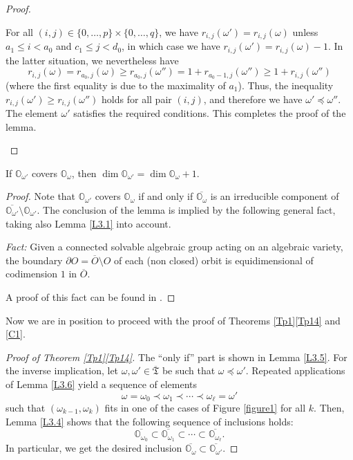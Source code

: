 \documentclass[ALCO,Unicode]{cedram}
\newcommand{\Xorbit}{\mathbb{O}}
\newcommand{\ppermutationsof}{\mathfrak{T}}
\newcommand{\parameters}{\overline{\ppermutationsof}}
\begin{document}
\begin{proof}
\begin{enumerate}[label=\textbf{Case \arabic*}]
For all $(i,j)\in\{0,\ldots,p\}\times\{0,\ldots,q\}$, we have $r_{i,j}(\omega')=r_{i,j}(\omega)$ unless $a_1\leq i<a_0$ and $c_1\leq j<d_0$, in which case we have $r_{i,j}(\omega')=r_{i,j}(\omega)-1$. In the latter situation, we nevertheless have
\[
r_{i,j}(\omega)=r_{a_0,j}(\omega)\geq r_{a_0,j}(\omega'')=1+r_{a_0-1,j}(\omega'')\geq 1+r_{i,j}(\omega'')
\]
(where the first equality is due to the maximality of $a_1$). Thus, the inequality $r_{i,j}(\omega')\geq r_{i,j}(\omega'')$ holds for all pair $(i,j)$, and therefore we have $\omega'\preceq\omega''$. The element $\omega'$ satisfies the required conditions. This completes the proof of the lemma.\qedhere
\end{enumerate}
\end{proof}

\begin{lemma}
\label{L3.7}
If $\Xorbit_{\omega'}$ covers $\Xorbit_\omega$, then $\dim\Xorbit_{\omega'}=\dim\Xorbit_\omega+1$.
\end{lemma}

\begin{proof}
Note that $\Xorbit_{\omega'}$ covers $\Xorbit_\omega$ if and only if $\overline{\Xorbit_\omega}$ is an irreducible component of $\overline{\Xorbit_{\omega'}}\setminus\Xorbit_{\omega'}$.
The conclusion of the lemma is implied by the following general fact, taking also Lemma \ref{L3.1} into account.

\smallskip
\noindent
{\it Fact:} Given a connected solvable algebraic group acting on an algebraic variety, the boundary $\partial O=\overline{O}\setminus O$ of each (non closed) orbit is equidimensional of codimension $1$ in $\overline{O}$.

\smallskip
\noindent
A proof of this fact can be found in \cite[Lemmas 2.12--2.13]{Timashev}.
\end{proof}

Now we are in position to proceed with the proof of Theorems \ref{Tp1}\ref{Tp14} and \ref{C1}.

\begin{proof}[Proof of Theorem \ref{Tp1}\ref{Tp14}] The ``only if'' part is shown in Lemma \ref{L3.5}. For the inverse implication, let $\omega,\omega'\in\parameters$ be such that $\omega\preceq\omega'$. Repeated applications of Lemma \ref{L3.6}
yield a sequence of elements
\[\omega=\omega_0\prec \omega_1\prec\cdots\prec \omega_\ell=\omega'\]
such that $(\omega_{k-1},\omega_k)$ fits in one of the cases of Figure \ref{figure1} for all $k$.
Then, Lemma \ref{L3.4} shows that the following sequence of inclusions holds:
\[\overline{\Xorbit_{\omega_0}}\subset \overline{\Xorbit_{\omega_1}}\subset\cdots\subset \overline{\Xorbit_{\omega_\ell}}.\]
In particular, we get the desired inclusion $\overline{\Xorbit_\omega}\subset\overline{\Xorbit_{\omega'}}$.
\end{proof}
\end{document}
